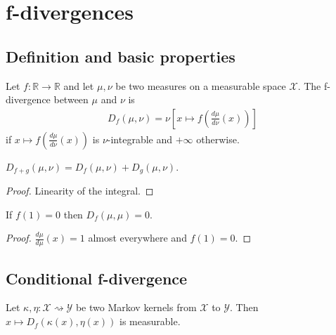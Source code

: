 \chapter{f-divergences}

\section{Definition and basic properties}

\begin{definition}[f-divergence]
  \label{def:fDiv}
  Let $f : \mathbb{R} \to \mathbb{R}$ and let $\mu, \nu$ be two measures on a measurable space $\mathcal X$. The f-divergence between $\mu$ and $\nu$ is
  \begin{align*}
  D_f(\mu, \nu) = \nu\left[x \mapsto f\left(\frac{d \mu}{d \nu}(x)\right)\right]
  \end{align*}
  if $x \mapsto f\left(\frac{d \mu}{d \nu}(x)\right)$ is $\nu$-integrable and $+\infty$ otherwise.
\end{definition}

\begin{lemma}
  \label{lem:fDiv_add}
  $D_{f + g}(\mu, \nu) = D_f(\mu, \nu) + D_g(\mu, \nu)$.
\end{lemma}

\begin{proof}
Linearity of the integral.
\end{proof}

\begin{lemma}
  \label{lem:fDiv_self}
  If $f(1) = 0$ then $D_{f}(\mu, \mu) = 0$.
\end{lemma}

\begin{proof}
$\frac{d \mu}{d \mu}(x) = 1$ almost everywhere and $f(1) = 0$.
\end{proof}

\section{Conditional f-divergence}

\begin{lemma}
  \label{lem:measurable_fDiv}
  Let $\kappa, \eta : \mathcal X \rightsquigarrow \mathcal Y$ be two Markov kernels from $\mathcal X$ to $\mathcal Y$. Then $x \mapsto D_f(\kappa(x), \eta(x))$ is measurable.
\end{lemma}

